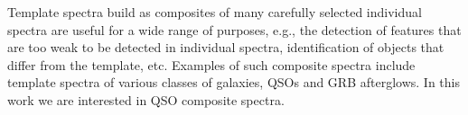 \documentclass{aa}    %
\newcommand{\sectionname}{Section}
\newcommand{\Sect}[1]{\sectionname~\ref{sect:#1}}
\newcommand{\sect}[1]{\Sect{#1}}
\newcommand{\todo}[3]{{\color{#2}\emph{#1}: #3}}
\newcommand{\jstodo}[1]{\todo{TODO }{green}{#1}}
\newcommand{\qtodo}[1]{\todo{Question}{red}{#1}}
\begin{document}
%
%
%
%
%
%
%
%
%
%
%
%
%
%

Template spectra build as composites of many carefully selected individual spectra
are useful for a wide range of purposes, e.g., the detection
of features that are too weak to be detected in individual spectra,
identification of objects that differ from the template, etc. Examples of such
composite spectra include template spectra of various classes of galaxies\citep{Mannucci2001, Shapley2003, Dobos2012}, QSOs\citep{CristianiS.andVio1990, Boyle1990, Francis1991, Zheng1997, Brotherton2000, VandenBerk2001, Telfer2002, Richards2006a, Glikman2006, Lusso2015} and GRB afterglows\citep{Christensen2011}. In this work we are interested in QSO composite spectra.
\end{document}
